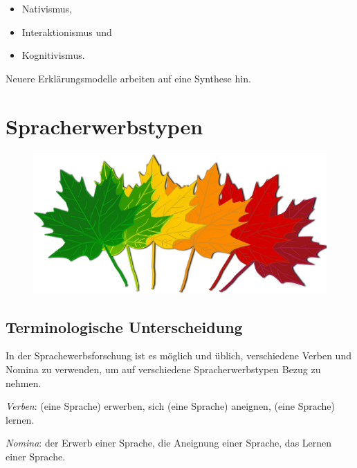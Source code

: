 \documentclass[
  letterpaper,
]{scrbook}
\providecommand{\tightlist}{%
  \setlength{\itemsep}{0pt}\setlength{\parskip}{0pt}}\usepackage{longtable,booktabs,array}
\begin{document}
\begin{itemize}
\tightlist
\item
  Nativismus,
\item
  Interaktionismus und
\item
  Kognitivismus.
\end{itemize}

Neuere Erklärungsmodelle arbeiten auf eine Synthese hin.

\hypertarget{sec-zungenbrecher}{%
\chapter{Spracherwerbstypen}\label{sec-zungenbrecher}}

\begin{figure}

{\centering 

\href{https://www.clipartmax.com/middle/m2i8K9K9N4m2A0A0_fall-leaves-clip-art-september-writing/}{\includegraphics[width=1\textwidth,height=\textheight]{./pictures/clipart49430.png}}

}

\end{figure}

\hypertarget{terminologische-unterscheidung}{%
\section{Terminologische
Unterscheidung}\label{terminologische-unterscheidung}}

In der Sprachewerbsforschung ist es möglich und üblich, verschiedene
Verben und Nomina zu verwenden, um auf verschiedene Spracherwerbstypen
Bezug zu nehmen.

\emph{Verben}: (eine Sprache) erwerben, sich (eine Sprache) aneignen,
(eine Sprache) lernen.

\emph{Nomina}: der Erwerb einer Sprache, die Aneignung einer Sprache,
das Lernen einer Sprache.
\end{document}
